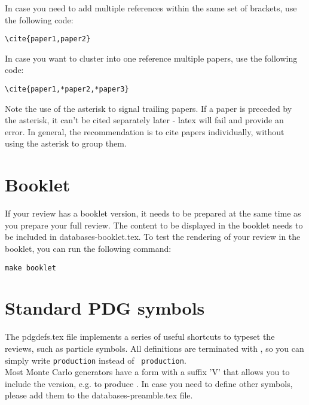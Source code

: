 In case you need to add multiple references within the same set of brackets, use the following code:
\begin{verbatim}
\cite{paper1,paper2}
\end{verbatim}
In case you want to cluster into one reference multiple papers, use the following code:
\begin{verbatim}
\cite{paper1,*paper2,*paper3}
\end{verbatim}
Note the use of the asterisk to signal trailing papers. 
If a paper is preceded by the asterisk, it can't be cited separately later - latex will fail and provide an error.
In general, the recommendation is to cite papers individually, without using the asterisk to group them.


\section{Booklet}

If your review has a booklet version, it needs to be prepared at the same time as you prepare your full review.
The content to be displayed in the booklet needs to be included in databases-booklet.tex. 
To test the rendering of your review in the booklet, you can run the following command:
\begin{verbatim}
make booklet
\end{verbatim}





\section{Standard PDG symbols}

The pdgdefs.tex file implements a series of useful shortcuts to typeset the reviews, such as particle symbols. 
All definitions are terminated with  \texttt{\string\xspace} , so you can simply write  \texttt{\string\ttbar} \texttt{production} instead of  \texttt{\string\ttbar \string\ production}.\\
Most Monte Carlo generators have a form with a suffix 'V' that allows you to include the version, e.g. \texttt{\string{}} to produce \texttt{}.
In case you need to define other symbols, please add them to the databases-preamble.tex file.


